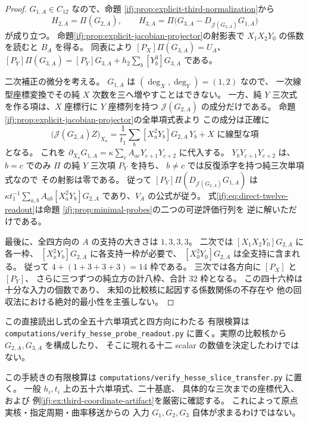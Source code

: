 \begin{proof}
$G_{1,A}\in C_{12}$ なので、命題
\ref{ifj:prop:explicit-third-normalization}から
\[
 H_{2,A}=\Pi(G_{2,A}),\qquad
 H_{3,A}=\Pi\bigl(G_{3,A}
          -D_{\mathcal J(G_{2,A})}G_{1,A}\bigr)
\]
が成り立つ。
命題\ref{ifj:prop:explicit-jacobian-projector}の射影表で
$X_1X_2Y_0$ の係数を読むと $B_A$ を得る。
同表により $[P_X]\Pi(G_{3,A})=U_A$、
$[P_Y]\Pi(G_{3,A})
 =[P_Y]G_{3,A}+h_2\sum_b[Y_b^3]G_{3,A}$ である。

二次補正の微分を考える。
$G_{1,A}$ は $(\deg_X,\deg_Y)=(1,2)$ なので、
一次線型座標変換でその純 $X$ 次数を三へ増やすことはできない。
一方、純 $Y$ 三次式を作る項は、$X$ 座標行に
$Y$ 座標列を持つ $\mathcal J(G_{2,A})$ の成分だけである。
命題\ref{ifj:prop:explicit-jacobian-projector}の全単項式表より
この成分は正確に
\[
  \bigl(\mathcal J(G_{2,A})Z\bigr)_{X_a}
     =\frac1{t_1}\sum_b
           [X_a^2Y_b]G_{2,A}\,Y_b
       +\text{$X$ に線型な項}
\]
となる。
これを $\partial_{X_a}G_{1,A}
=\kappa\sum_c A_{ac}Y_{c+1}Y_{c+2}$ に代入する。
$Y_bY_{c+1}Y_{c+2}$ は、$b=c$ でのみ
$\Pi$ の純 $Y$ 三次項 $P_Y$ を持ち、
$b\ne c$ では反復添字を持つ純三次単項式なので
その射影は零である。
従って $[P_Y]\Pi(D_{\mathcal J(G_{2,A})}G_{1,A})$
は $\kappa t_1^{-1}\sum_{a,b}A_{ab}[X_a^2Y_b]G_{2,A}$
であり、$V_A$ の公式が従う。
式\eqref{ifj:eq:direct-twelve-readout}は命題
\ref{ifj:prop:minimal-probes}の二つの可逆評価行列を
逆に解いただけである。

最後に、全四方向の $A$ の支持の大きさは $1,3,3,3$。
二次では $[X_1X_2Y_0]G_{2,A}$ に各一枠、
$[X_a^2Y_b]G_{2,A}$ に各支持一枠が必要で、
$[X_0^2Y_0]G_{2,A}$ は全支持に含まれる。
従って $4+(1+3+3+3)=14$ 枠である。
三次では各方向に $[P_X]$ と $[P_Y]$、
さらに三つずつの純立方の計八枠、合計 $32$ 枠となる。
この四十六枠は十分な入力の個数であり、
未知の比較核に起因する係数関係の不存在や
他の回収法における絶対的最小性を主張しない。
\end{proof}

この直接読出し式の全五十六単項式と四方向にわたる
有限検算は \texttt{computations/verify\_hesse\_probe\_readout.py}
に置く。実際の比較核から $G_{2,A},G_{3,A}$ を構成したり、
そこに現れる十二 scalar の数値を決定したわけではない。

この手続きの有限検算は
\texttt{computations/verify\_hesse\_slice\_transfer.py} に置く。
一般 $h_i,t_i$ 上の五十六単項式、二十基底、
具体的な三次までの座標代入、および
例\ref{ifj:ex:third-coordinate-artifact}を厳密に確認する。
これによって原点実核・指定周期・曲率移送からの
入力 $G_1,G_2,G_3$ 自体が求まるわけではない。

